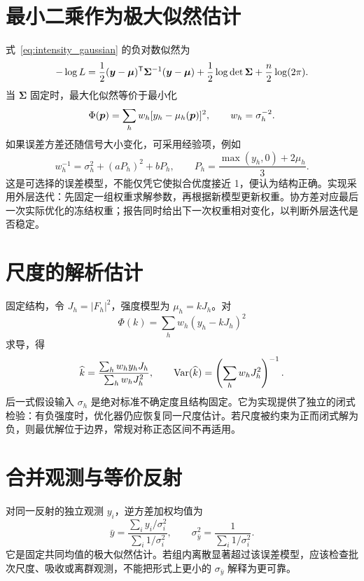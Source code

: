 \section{最小二乘作为极大似然估计}
式~\eqref{eq:intensity_gaussian} 的负对数似然为
\begin{equation}
-\log L=\frac12(\bm{y}-\bm{\mu})^{\mathsf T}\bm{\Sigma}^{-1}(\bm{y}-\bm{\mu})
+\frac12\log\det\bm{\Sigma}+\frac{n}{2}\log(2\pi).
\end{equation}
当 $\bm{\Sigma}$ 固定时，最大化似然等价于最小化
\begin{equation}
\Phi(\bm{p})=\sum_h w_h[y_h-\mu_h(\bm{p})]^2,
\qquad w_h=\sigma_h^{-2}.
\end{equation}
如果误差方差还随信号大小变化，可采用经验项，例如
\begin{equation}
w_h^{-1}=\sigma_h^2+(aP_h)^2+bP_h,
\qquad P_h=\frac{\max(y_h,0)+2\mu_h}{3}.
\label{eq:weight}
\end{equation}
这是可选择的误差模型，不能仅凭它使拟合优度接近 1，便认为结构正确。实现采用外层迭代：先固定一组权重求解参数，再根据新模型更新权重。协方差对应最后一次实际优化的冻结权重；报告同时给出下一次权重相对变化，以判断外层迭代是否稳定。

\section{尺度的解析估计}
固定结构，令 $J_h=|F_h|^2$，强度模型为 $\mu_h=kJ_h$。对
\begin{equation}
\Phi(k)=\sum_h w_h(y_h-kJ_h)^2
\end{equation}
求导，得
\begin{equation}
\widehat k=\frac{\sum_hw_hy_hJ_h}{\sum_hw_hJ_h^2},\qquad
\operatorname{Var}(\widehat k)=\left(\sum_hw_hJ_h^2\right)^{-1}.
\label{eq:scaleclosed}
\end{equation}
后一式假设输入 $\sigma_h$ 是绝对标准不确定度且结构固定。它为实现提供了独立的闭式检验：有负强度时，优化器仍应恢复同一尺度估计。若尺度被约束为正而闭式解为负，则最优解位于边界，常规对称正态区间不再适用。

\section{合并观测与等价反射}
对同一反射的独立观测 $y_i$，逆方差加权均值为
\begin{equation}
\bar y=\frac{\sum_i y_i/\sigma_i^2}{\sum_i1/\sigma_i^2},\qquad
\sigma_{\bar y}^2=\frac{1}{\sum_i1/\sigma_i^2}.
\end{equation}
它是固定共同均值的极大似然估计。若组内离散显著超过该误差模型，应该检查批次尺度、吸收或离群观测，不能把形式上更小的 $\sigma_{\bar y}$ 解释为更可靠。

